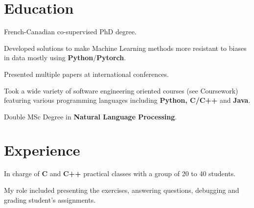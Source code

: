 \documentclass[]{deedy-resume-openfont}
\begin{document}
\begin{minipage}[t]{0.7\textwidth} 


\section{Education}
\vspace{\topsep}
\begin{tightemize}
\item French-Canadian co-supervised PhD degree.
\item Developed solutions to make Machine Learning methods more resistant to biases in data mostly using \textbf{Python}/\textbf{Pytorch}.
\item Presented multiple papers at international conferences.
\end{tightemize}
\sectionsep

\begin{tightemize}
\item Took a wide variety of software engineering oriented courses (see Coursework) featuring various programming languages including \textbf{Python, C/C++} and \textbf{Java}.
\item Double MSc Degree in \textbf{Natural Language Processing}.
\end{tightemize}
\sectionsep

\sectionsep


\section{Experience}
\begin{tightemize}
\item In charge of \textbf{C} and \textbf{C++} practical classes with a group of 20 to 40 students.
\item My role included presenting the exercises, answering questions, debugging and grading student's assignments.
\end{tightemize}
\sectionsep


\end{minipage}
\end{document}
